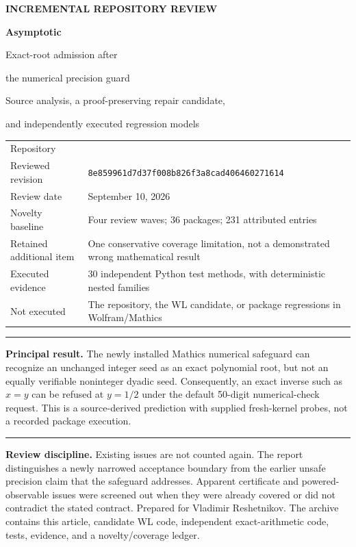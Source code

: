 \documentclass[11pt,letterpaper]{article}
\newcommand{\code}[1]{\texttt{\detokenize{#1}}}
\newcommand{\pin}{8e859961d7d37f008b826f3a8cad406460271614}
\begin{document}
\begin{titlepage}
\vspace*{0.35in}
{\small\bfseries\color{accent}INCREMENTAL REPOSITORY REVIEW}\par
\vspace{0.30in}
{\Huge\bfseries\color{ink}Asymptotic}\par
\vspace{0.14in}
{\LARGE Exact-root admission after\par the numerical precision guard}\par
\vspace{0.35in}
{\large Source analysis, a proof-preserving repair candidate,\par and independently executed regression models}\par
\vspace{0.35in}
\begin{tabularx}{\textwidth}{@{}lY@{}}
Repository & \code{VladimirReshetnikov/Asymptotic}\\[5pt]
Reviewed revision & \small\texttt{\pin}\\[5pt]
Review date & September 10, 2026\\[5pt]
Novelty baseline & Four review waves; 36 packages; 231 attributed entries\\[5pt]
Retained additional item & One conservative coverage limitation, not a demonstrated wrong mathematical result\\[5pt]
Executed evidence & 30 independent Python test methods, with deterministic nested families\\[5pt]
Not executed & The repository, the WL candidate, or package regressions in Wolfram/Mathics\\
\end{tabularx}
\vspace{0.25in}\hrule\vspace{0.12in}
\textbf{Principal result.} The newly installed Mathics numerical safeguard can recognize an unchanged integer seed as an exact polynomial root, but not an equally verifiable noninteger dyadic seed. Consequently, an exact inverse such as $x=y$ can be refused at $y=1/2$ under the default 50-digit numerical-check request. This is a source-derived prediction with supplied fresh-kernel probes, not a recorded package execution.
\vspace{0.12in}\hrule
\vfill
\textbf{Review discipline.} Existing issues are not counted again. The report distinguishes a newly narrowed acceptance boundary from the earlier unsafe precision claim that the safeguard addresses. Apparent certificate and powered-observable issues were screened out when they were already covered or did not contradict the stated contract.
\vspace{0.2in}
{\small Prepared for Vladimir Reshetnikov. The archive contains this article, candidate WL code, independent exact-arithmetic code, tests, evidence, and a novelty/coverage ledger.}
\end{titlepage}
{\small\setlength{\parskip}{0pt}\tableofcontents}
\clearpage
\end{document}
